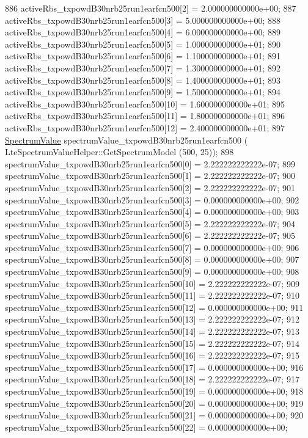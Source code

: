 \begin{DoxyCode}
886   activeRbs\_txpowdB30nrb25run1earfcn500[2] = 2.000000000000e+00;
887   activeRbs\_txpowdB30nrb25run1earfcn500[3] = 5.000000000000e+00;
888   activeRbs\_txpowdB30nrb25run1earfcn500[4] = 6.000000000000e+00;
889   activeRbs\_txpowdB30nrb25run1earfcn500[5] = 1.000000000000e+01;
890   activeRbs\_txpowdB30nrb25run1earfcn500[6] = 1.100000000000e+01;
891   activeRbs\_txpowdB30nrb25run1earfcn500[7] = 1.300000000000e+01;
892   activeRbs\_txpowdB30nrb25run1earfcn500[8] = 1.400000000000e+01;
893   activeRbs\_txpowdB30nrb25run1earfcn500[9] = 1.500000000000e+01;
894   activeRbs\_txpowdB30nrb25run1earfcn500[10] = 1.600000000000e+01;
895   activeRbs\_txpowdB30nrb25run1earfcn500[11] = 1.800000000000e+01;
896   activeRbs\_txpowdB30nrb25run1earfcn500[12] = 2.400000000000e+01;
897   \hyperlink{classns3_1_1SpectrumValue}{SpectrumValue} spectrumValue\_txpowdB30nrb25run1earfcn500 (
      LteSpectrumValueHelper::GetSpectrumModel (500, 25));
898   spectrumValue\_txpowdB30nrb25run1earfcn500[0] = 2.222222222222e-07;
899   spectrumValue\_txpowdB30nrb25run1earfcn500[1] = 2.222222222222e-07;
900   spectrumValue\_txpowdB30nrb25run1earfcn500[2] = 2.222222222222e-07;
901   spectrumValue\_txpowdB30nrb25run1earfcn500[3] = 0.000000000000e+00;
902   spectrumValue\_txpowdB30nrb25run1earfcn500[4] = 0.000000000000e+00;
903   spectrumValue\_txpowdB30nrb25run1earfcn500[5] = 2.222222222222e-07;
904   spectrumValue\_txpowdB30nrb25run1earfcn500[6] = 2.222222222222e-07;
905   spectrumValue\_txpowdB30nrb25run1earfcn500[7] = 0.000000000000e+00;
906   spectrumValue\_txpowdB30nrb25run1earfcn500[8] = 0.000000000000e+00;
907   spectrumValue\_txpowdB30nrb25run1earfcn500[9] = 0.000000000000e+00;
908   spectrumValue\_txpowdB30nrb25run1earfcn500[10] = 2.222222222222e-07;
909   spectrumValue\_txpowdB30nrb25run1earfcn500[11] = 2.222222222222e-07;
910   spectrumValue\_txpowdB30nrb25run1earfcn500[12] = 0.000000000000e+00;
911   spectrumValue\_txpowdB30nrb25run1earfcn500[13] = 2.222222222222e-07;
912   spectrumValue\_txpowdB30nrb25run1earfcn500[14] = 2.222222222222e-07;
913   spectrumValue\_txpowdB30nrb25run1earfcn500[15] = 2.222222222222e-07;
914   spectrumValue\_txpowdB30nrb25run1earfcn500[16] = 2.222222222222e-07;
915   spectrumValue\_txpowdB30nrb25run1earfcn500[17] = 0.000000000000e+00;
916   spectrumValue\_txpowdB30nrb25run1earfcn500[18] = 2.222222222222e-07;
917   spectrumValue\_txpowdB30nrb25run1earfcn500[19] = 0.000000000000e+00;
918   spectrumValue\_txpowdB30nrb25run1earfcn500[20] = 0.000000000000e+00;
919   spectrumValue\_txpowdB30nrb25run1earfcn500[21] = 0.000000000000e+00;
920   spectrumValue\_txpowdB30nrb25run1earfcn500[22] = 0.000000000000e+00;

\end{DoxyCode}
